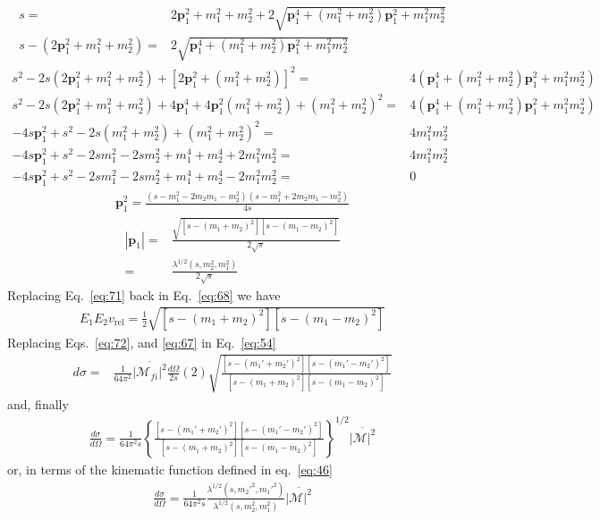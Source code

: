 \begin{align}
  \label{eq:70}
  s=&2\mathbf{p}_1^2+m_1^2+m_2^2+2\sqrt{\mathbf{p}_1^4+(m_1^2+m_2^2)\mathbf{p}_1^2+m_1^2m_2^2}\nonumber\\
s-(2\mathbf{p}_1^2+m_1^2+m_2^2)=&2\sqrt{\mathbf{p}_1^4+(m_1^2+m_2^2)\mathbf{p}_1^2+m_1^2m_2^2}
\end{align}
\begin{align}
  s^2-2s(2\mathbf{p}_1^2+m_1^2+m_2^2)+[2\mathbf{p}_1^2+(m_1^2+m_2^2)]^2=&4(\mathbf{p}_1^4+(m_1^2+m_2^2)\mathbf{p}_1^2+m_1^2m_2^2)\nonumber\\
  s^2-2s(2\mathbf{p}_1^2+m_1^2+m_2^2)+4\mathbf{p}_1^4+4\mathbf{p}_1^2(m_1^2+m_2^2)
+(m_1^2+m_2^2)^2=&4(\mathbf{p}_1^4+(m_1^2+m_2^2)\mathbf{p}_1^2+m_1^2m_2^2)\nonumber\\
-4s\mathbf{p}_1^2+s^2-2s(m_1^2+m_2^2)+(m_1^2+m_2^2)^2=&4m_1^2m_2^2\nonumber\\
-4s\mathbf{p}_1^2+s^2-2sm_1^2-2sm_2^2+m_1^4+m_2^4+2m_1^2m_2^2=&4m_1^2m_2^2\nonumber\\
-4s\mathbf{p}_1^2+s^2-2sm_1^2-2sm_2^2+m_1^4+m_2^4-2m_1^2m_2^2=&0
\end{align}
\begin{align}
  \mathbf{p}_1^2=\frac{\left(s-m_1^2-2 m_2 m_1-m_2^2\right)
   \left(s-m_1^2+2 m_2m_1-m_2^2\right)}
{4s}
\end{align}
\begin{align}
  \label{eq:71}
  |\mathbf{p}_1|=&\frac{\sqrt{[s-(m_1+m_2)^2][s-(m_1-m_2)^2]}}{2\sqrt{s}}\nonumber\\
=&\frac{\lambda^{1/2}(s,m_2^2,m_1^2)}{2\sqrt{s}}
\end{align}
Replacing Eq.~\eqref{eq:71} back in Eq.~\eqref{eq:68} we have
\begin{align}
  \label{eq:72}
  E_1E_2 v_{\text{rel}}=\frac{1}{2}\sqrt{[s-(m_1+m_2)^2][s-(m_1-m_2)^2]}
\end{align}
Replacing Eqs.~\eqref{eq:72}, and \eqref{eq:67} in Eq.~\eqref{eq:54}
\begin{align}
  \label{eq:73}
  d\sigma=&\frac{1}{64\pi^2}\overline{\left|\mathcal{M}_{fi}\right|^2}\frac{d\Omega}{2s}(2)
\sqrt{\frac{[s-(m_1'+m_2')^2][s-(m_1'-m_2')^2]}{[s-(m_1+m_2)^2][s-(m_1-m_2)^2]}}
\end{align}
and, finally
\begin{align}
  \label{eq:74}
  \frac{d\sigma}{d\Omega}=\frac{1}{64\pi^2s}\left\{
\frac{[s-(m_1'+m_2')^2][s-(m_1'-m_2')^2]}{[s-(m_1+m_2)^2][s-(m_1-m_2)^2]}\right\}^{1/2}
\overline{|\mathcal{M}|^2}
\end{align}
or, in terms of the kinematic function defined in eq.~\eqref{eq:46}
\begin{align}
  \label{eq:74}
  \frac{d\sigma}{d\Omega}=\frac{1}{64\pi^2s}
\frac{\lambda^{1/2}(s,{m_2'}^2,{m_1'}^2)}{\lambda^{1/2}(s,m_2^2,m_1^2)}
\overline{|\mathcal{M}|^2}
\end{align}

